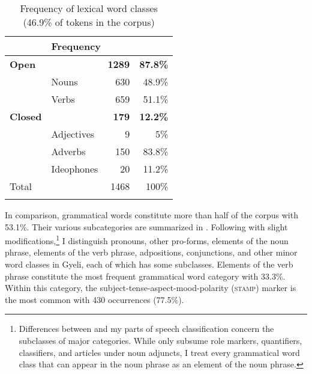 \begin{table}
\begin{tabular}{ll rr}
 \lsptoprule
  \multicolumn{2}{l}{Word class} &  \multicolumn{2}{l}{Frequency}  \\ %
 \midrule
  {\bfseries Open} &  & {\bfseries 1289} &  {\bfseries 87.8\%} \\
  \midrule
  & Nouns  & 630  & 48.9\% \\
 &   Verbs  &  659  & 51.1\%  \\ %
 \midrule
  {\bfseries Closed} &  & {\bfseries 179} & {\bfseries 12.2\%} \\
  \midrule
 & Adjectives &  9 & 5\%   \\
  & Adverbs   & 150 & 83.8\%   \\ %
 & Ideophones    &  20  & 11.2\% \\
 \midrule
Total & & 1468 & 100\% \\
 \lspbottomrule
\end{tabular}
\caption{Frequency of lexical word classes (46.9\% of tokens in the corpus)}
\label{Tab:POSnolex}
\end{table}


In comparison, grammatical words constitute more than half of the corpus with 53.1\%. Their various subcategories are summarized in .  Following \citet{schachter2007} with slight modifications,\footnote{Differences between \citet{schachter2007} and my parts of speech classification concern the subclasses of major categories. While \citet[35]{schachter2007} only subsume role markers, quantifiers, classifiers, and articles under noun adjuncts, I treat every grammatical word class that can appear in the noun phrase as an element of the noun phrase.} I distinguish pronouns, other pro-forms, elements of the noun phrase, elements of the verb phrase, adpositions, conjunctions, and other minor word classes in Gyeli, each of which has some subclasses. Elements of the verb phrase constitute the most frequent grammatical word category with 33.3\%. Within this category, the subject-tense-aspect-mood-polarity (\textsc{stamp}) marker is the most common with 430 occurrences (77.5\%).

\iffalse

